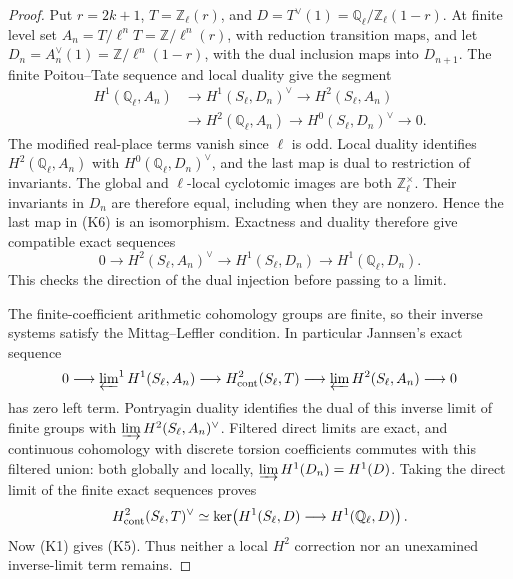 \documentclass[11pt,a4paper]{article}
\theoremstyle{definition}
\begin{document}
\begin{proof}
Put \(r=2k+1\), \(T=\mathbb Z_\ell(r)\), and
\(D=T^\vee(1)=\mathbb Q_\ell/\mathbb Z_\ell(1-r)\).
At finite level set
\(A_n=T/\ell^nT=\mathbb Z/\ell^n(r)\), with reduction
transition maps, and let
\(D_n=A_n^\vee(1)=\mathbb Z/\ell^n(1-r)\), with the
dual inclusion maps into \(D_{n+1}\).
The finite Poitou--Tate sequence and local duality
\cite[I, Theorem~4.10; II, Theorem~2.9]{MilneADT}
give the segment
\[
\begin{split}
 H^1(\mathbb Q_\ell,A_n)&\longrightarrow H^1(S_\ell,D_n)^\vee
 \longrightarrow H^2(S_\ell,A_n)\\
 &\longrightarrow H^2(\mathbb Q_\ell,A_n)
 \longrightarrow H^0(S_\ell,D_n)^\vee\longrightarrow0.
\end{split}
\tag{K6}
\]
The modified real-place terms vanish since \(\ell\) is odd.
Local duality identifies \(H^2(\mathbb Q_\ell,A_n)\) with
\(H^0(\mathbb Q_\ell,D_n)^\vee\), and the last map is dual to
restriction of invariants. The global and \(\ell\)-local
cyclotomic images are both \(\mathbb Z_\ell^\times\). Their
invariants in \(D_n\) are therefore equal, including when they are
nonzero. Hence the last map in (K6) is an isomorphism.
Exactness and duality therefore give compatible exact sequences
\[
 0\longrightarrow H^2(S_\ell,A_n)^\vee
 \longrightarrow H^1(S_\ell,D_n)
 \longrightarrow H^1(\mathbb Q_\ell,D_n).
\]
This checks the direction of the dual injection before passing
to a limit.

The finite-coefficient arithmetic cohomology groups are finite,
so their inverse systems satisfy the Mittag--Leffler condition.
In particular Jannsen's exact sequence
\cite[(3.1)]{Jannsen1988}
\[
 0\longrightarrow\varprojlim\nolimits^1 H^1(S_\ell,A_n)
 \longrightarrow H^2_{\rm cont}(S_\ell,T)
 \longrightarrow\varprojlim H^2(S_\ell,A_n)
 \longrightarrow0
\]
has zero left term. Pontryagin duality identifies the dual of
this inverse limit of finite groups with
\(\varinjlim H^2(S_\ell,A_n)^\vee\).
Filtered direct limits are exact, and continuous cohomology
with discrete torsion coefficients commutes with this filtered
union: both globally and locally,
\(\varinjlim H^1(D_n)=H^1(D)\).
Taking the direct limit of the finite exact sequences proves
\[
 H^2_{\rm cont}(S_\ell,T)^\vee
 \simeq\ker\!\left(H^1(S_\ell,D)
                   \longrightarrow H^1(\mathbb Q_\ell,D)\right).
\]
Now (K1) gives (K5). Thus neither a local \(H^2\) correction
nor an unexamined inverse-limit term remains.


\end{proof}
\end{document}

